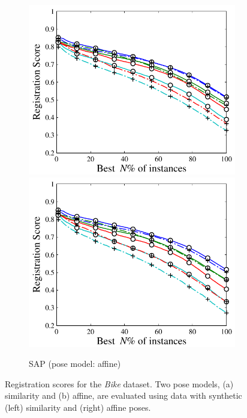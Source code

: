 \begin{figure}[ht]
\begin{subfigure}[b]{0.48\linewidth}
	\includegraphics[width=\linewidth]{fig/3dreg/reg2d_affsim.pdf}\vspace{3mm}
	\includegraphics[width=\linewidth]{fig/3dreg/reg2d_affaff.pdf}
	\caption{SAP (pose model: affine)}
\end{subfigure}
\caption{Registration scores for the \emph{Bike} dataset. Two pose models, (a) similarity and (b) affine, are evaluated using data with synthetic (left) similarity and (right) affine poses.}
\label{fig:regresult2d}
\end{figure}

